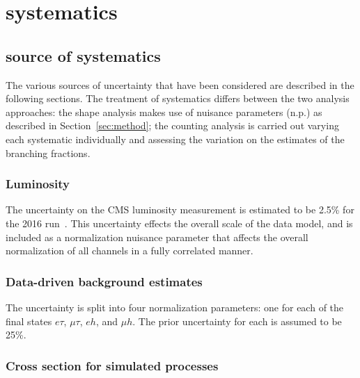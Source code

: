 \section{systematics}
\label{sec:analysis:systematics}

\subsection{source of systematics}
The various sources of uncertainty that have been considered are
described in the following sections.  The treatment of systematics
differs between the two analysis approaches: the shape analysis makes
use of nuisance parameters (n.p.) as described in Section~\ref{sec:method};
the counting analysis is carried out varying each systematic
individually and assessing the variation on the estimates of the
branching fractions.

\subsubsection{Luminosity} 
        
The uncertainty on the CMS luminosity measurement is estimated to be
2.5\% for the 2016 run~\cite{CMS-PAS-LUM-17-001}.  This uncertainty
effects the overall scale of the data model, and is included as a
normalization nuisance parameter that affects the overall normalization of all
channels in a fully correlated manner.

\subsubsection{Data-driven background estimates}

The uncertainty is split into four normalization parameters: one for
each of the final states $e\tau$, $\mu\tau$, $eh$, and $\mu h$.  The
prior uncertainty for each is assumed to be 25\%.

\subsubsection{Cross section for simulated processes}

